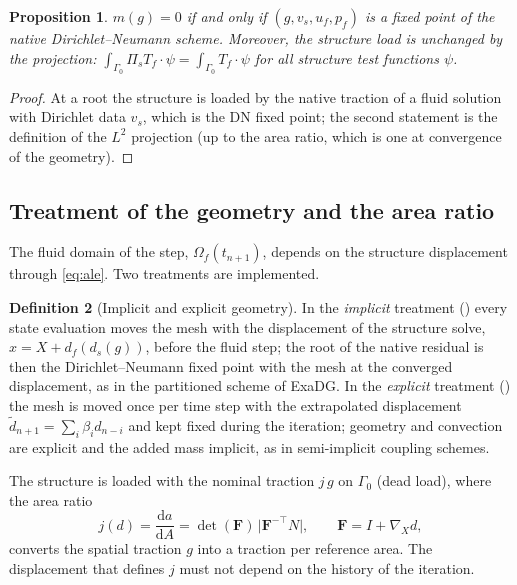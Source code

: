 \documentclass[11pt,a4paper]{article}
\newtheorem{proposition}{Proposition}[section]
\theoremstyle{definition}
\newtheorem{definition}[proposition]{Definition}
\theoremstyle{remark}
\newcommand{\G}{\Gamma}
\newcommand{\Pis}{\Pi_{s}}
\begin{document}
\begin{proposition}
$m(g)=0$ if and only if $(g,v_s,u_f,p_f)$ is a fixed point of the native Dirichlet--Neumann
scheme. Moreover, the structure load is unchanged by the projection:
$\int_{\G_0}\Pis T_f\cdot\psi = \int_{\G_0} T_f\cdot\psi$ for all structure test functions $\psi$.
\end{proposition}
\begin{proof}
At a root the structure is loaded by the native traction of a fluid solution with Dirichlet data
$v_s$, which is the DN fixed point; the second statement is the definition of the $L^2$ projection
(up to the area ratio, which is one at convergence of the geometry).
\end{proof}



\subsection{Treatment of the geometry and the area ratio}\label{sec:geometry}

The fluid domain of the step, $\Omega_f(t_{n+1})$, depends on the structure displacement through
\eqref{eq:ale}. Two treatments are implemented.

\begin{definition}[Implicit and explicit geometry]\label{def:geometry}
In the \emph{implicit} treatment () every state evaluation moves the
mesh with the displacement of the structure solve, $x=X+d_f(d_s(g))$, before the fluid step; the
root of the native residual is then the Dirichlet--Neumann fixed point with the mesh at the
converged displacement, as in the partitioned scheme of ExaDG. In the \emph{explicit} treatment
() the mesh is moved once per time step with the extrapolated
displacement $\tilde d_{n+1}=\sum_i\beta_id_{n-i}$ and kept fixed during the iteration; geometry and
convection are explicit and the added mass implicit, as in semi-implicit coupling schemes.
\end{definition}

The structure is loaded with the nominal traction $j\,g$ on $\G_0$ (dead load), where the area ratio
\begin{equation}\label{eq:area_ratio}
  j(d)=\frac{\mathrm{d}a}{\mathrm{d}A}=\det(\mathbf F)\,\big|\mathbf F^{-\top}N\big|,\qquad
  \mathbf F=I+\nabla_Xd,
\end{equation}
converts the spatial traction $g$ into a traction per reference area. The displacement that defines
$j$ must not depend on the history of the iteration.
\end{document}
